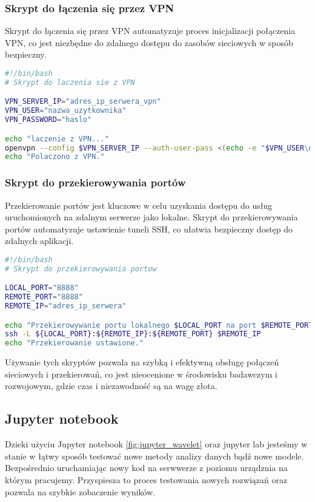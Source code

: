 \documentclass[12pt,twoside]{article}
\begin{document}
    \subsubsection{Skrypt do łączenia się przez VPN}
    Skrypt do łączenia się przez VPN automatyzuje proces inicjalizacji połączenia VPN, co jest niezbędne do zdalnego
    dostępu do zasobów sieciowych w sposób bezpieczny.

    \begin{lstlisting}[language=bash, caption=Skrypt do łączenia się przez VPN]
#!/bin/bash
# Skrypt do laczenia sie z VPN

VPN_SERVER_IP="adres_ip_serwera_vpn"
VPN_USER="nazwa_uzytkownika"
VPN_PASSWORD="haslo"

echo "laczenie z VPN..."
openvpn --config $VPN_SERVER_IP --auth-user-pass <(echo -e "$VPN_USER\n$VPN_PASSWORD")
echo "Polaczono z VPN."
    \end{lstlisting}

    \subsubsection{Skrypt do przekierowywania portów}
    Przekierowanie portów jest kluczowe w celu uzyskania dostępu do usług uruchomionych na zdalnym serwerze jako
    lokalne. Skrypt do przekierowywania portów automatyzuje ustawienie tuneli SSH, co ułatwia bezpieczny dostęp do
    zdalnych aplikacji.

    \begin{lstlisting}[language=bash, caption=Skrypt do przekierowywania portów]
#!/bin/bash
# Skrypt do przekierowywania portow

LOCAL_PORT="8888"
REMOTE_PORT="8888"
REMOTE_IP="adres_ip_serwera"

echo "Przekierowywanie portu lokalnego $LOCAL_PORT na port $REMOTE_PORT na serwerze $REMOTE_IP..."
ssh -L ${LOCAL_PORT}:${REMOTE_IP}:${REMOTE_PORT} $REMOTE_IP
echo "Przekierowanie ustawione."
    \end{lstlisting}

    Używanie tych skryptów pozwala na szybką i efektywną obsługę połączeń sieciowych i przekierowań, co jest nieocenione
    w środowisku badawczym i rozwojowym, gdzie czas i niezawodność są na wagę złota.

    \subsection{Jupyter notebook}
    Dzieki użyciu Jupyter notebook \ref{fig:jupyter_wavelet}
    oraz jupyter lab jesteśmy w stanie w łątwy sposób testować nowe metody analizy danych bądź nowe modele. Bezpośrednio
    uruchamiając nowy kod na serwwerze z poziomu urządznia na którym pracujemy. Przyspiesza to proces testowania nowych
    rozwiązań oraz pozwala na szybkie zobaczenie wyników.
\end{document}

